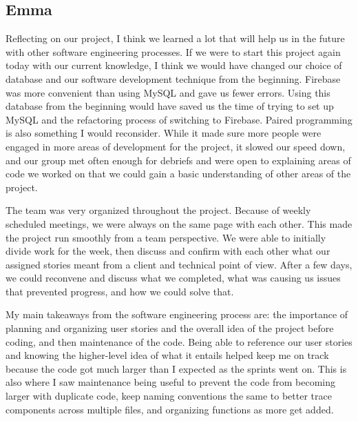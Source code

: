 \subsection{Emma}
Reflecting on our project, I think we learned a lot that will help us in the future with other software engineering processes. If we were to start this project again today with our current knowledge, I think we would have changed our choice of database and our software development technique from the beginning. Firebase was more convenient than using MySQL and gave us fewer errors. Using this database from the beginning would have saved us the time of trying to set up MySQL and the refactoring process of switching to Firebase. Paired programming is also something I would reconsider. While it made sure more people were engaged in more areas of development for the project, it slowed our speed down, and our group met often enough for debriefs and were open to explaining areas of code we worked on that we could gain a basic understanding of other areas of the project. \par
The team was very organized throughout the project. Because of weekly scheduled meetings, we were always on the same page with each other. This made the project run smoothly from a team perspective. We were able to initially divide work for the week, then discuss and confirm with each other what our assigned stories meant from a client and technical point of view. After a few days, we could reconvene and discuss what we completed, what was causing us issues that prevented progress, and how we could solve that. \par
My main takeaways from the software engineering process are: the importance of planning and organizing user stories and the overall idea of the project before coding, and then maintenance of the code. Being able to reference our user stories and knowing the higher-level idea of what it entails helped keep me on track because the code got much larger than I expected as the sprints went on. This is also where I saw maintenance being useful to prevent the code from becoming larger with duplicate code, keep naming conventions the same to better trace components across multiple files, and organizing functions as more get added. \par


